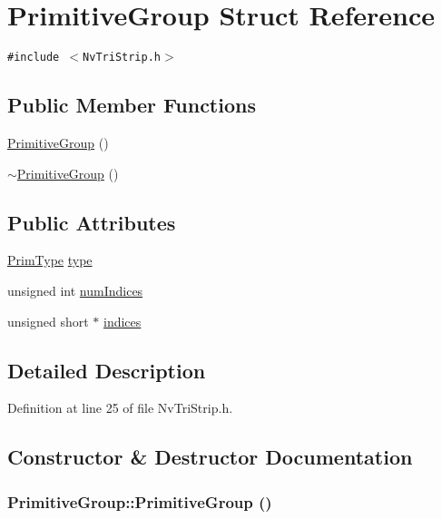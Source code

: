 \hypertarget{struct_primitive_group}{
\section{PrimitiveGroup Struct Reference}
\label{struct_primitive_group}
}
{\tt \#include $<$NvTriStrip.h$>$}

\subsection*{Public Member Functions}
\begin{CompactItemize}
\item 
\hyperlink{struct_primitive_group_dec4d8824a3efe35ab6fcab9636c8c4a}{PrimitiveGroup} ()
\item 
\hyperlink{struct_primitive_group_1629c6d3a3340bfea6376bcb48ac992a}{$\sim$PrimitiveGroup} ()
\end{CompactItemize}
\subsection*{Public Attributes}
\begin{CompactItemize}
\item 
\hyperlink{_nv_tri_strip_8h_c1b882ceab790e8c509ecccfff21c734}{PrimType} \hyperlink{struct_primitive_group_c0a1329776ca79245b14359eb0bcef0b}{type}
\item 
unsigned int \hyperlink{struct_primitive_group_83b7a3200f28a02beeb18b648c341e7e}{numIndices}
\item 
unsigned short $\ast$ \hyperlink{struct_primitive_group_307770a1acceb3450fcf0e9af4ee3ec8}{indices}
\end{CompactItemize}


\subsection{Detailed Description}


Definition at line 25 of file NvTriStrip.h.

\subsection{Constructor \& Destructor Documentation}
\hypertarget{struct_primitive_group_dec4d8824a3efe35ab6fcab9636c8c4a}{
\subsubsection[{PrimitiveGroup}]{\setlength{\rightskip}{0pt plus 5cm}PrimitiveGroup::PrimitiveGroup ()}}
\label{struct_primitive_group_dec4d8824a3efe35ab6fcab9636c8c4a}




